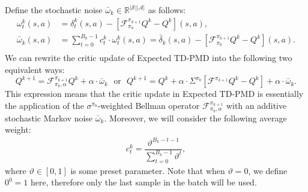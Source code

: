 \documentclass[10pt]{article}
\newcommand{\calA}{\mathcal{A}}
\newcommand{\calS}{\mathcal{S}}
\newcommand{\calF}{\mathcal{F}}
\newcommand{\E}{\mathbb{E}}
\newcommand{\ls}{\left}
\newcommand{\rs}{\right}
\theoremstyle{plain}
\theoremstyle{definition}
\begin{document}
Define the stochastic noise $\bar\omega_k \in \mathbb{R}^{|\calS||\calA|}$ as follows:
\begin{equation}
\begin{aligned}
    \omega_t^k(s,a) &= \delta_t^k(s,a) - \ls[ \calF^{\pi_{k+1}}_{\pi_b} Q^k - Q^k \rs](s,a), \\
    \bar\omega_k(s,a) &=  {\sum_{t=0}^{B_k-1} c_t^k \cdot \omega_t^k(s,a)} = \bar\delta_k(s,a) - \ls[ \calF^{\pi_{k+1}}_{\pi_b} Q^k - Q^k \rs](s,a).\\
\end{aligned}
    \label{eq:Expected-TD-AC-PMD:stochastic-noise}
\end{equation}
We can rewrite the critic update of Expected TD-PMD into the following two equivalent ways: 
\begin{equation}
    Q^{k+1} = \calF^{\pi_{k+1}}_{\pi_b, \alpha} Q^k + \alpha\cdot \bar\omega_k\,\,\mbox{ or }\,\,
    Q^{k+1} = Q^k + \alpha\cdot \Sigma^{\pi_b} \ls[ \calF^{\pi_{k+1}} Q^k - Q^k \rs] + \alpha\cdot \bar\omega_k.
    \label{eq:Expected-TD-AC-PMD:critic-update}
\end{equation}
This expression means that the critic update in Expected TD-PMD is essentially the application of the $\sigma^{\pi_b}$-weighted Bellman operator $\calF^{\pi_{k+1}}_{\pi_b, \alpha}$ with an additive stochastic Markov noise $\bar\omega_k$.  Moreover, we will consider the following average weight:
\begin{align}
    c_t^k = \dfrac{\vartheta^{B_k - t - 1}}{\sum_{t=0}^{B_k-1} \vartheta^{t}},
    \label{eq:Expected-TD-AC-PMD:average-weight}
\end{align}
where $\vartheta \in [0,1]$ is some preset parameter. Note that when $\vartheta =0$, we define $0^0=1$ here, therefore only the last sample in the batch will be used. 
\end{document}
